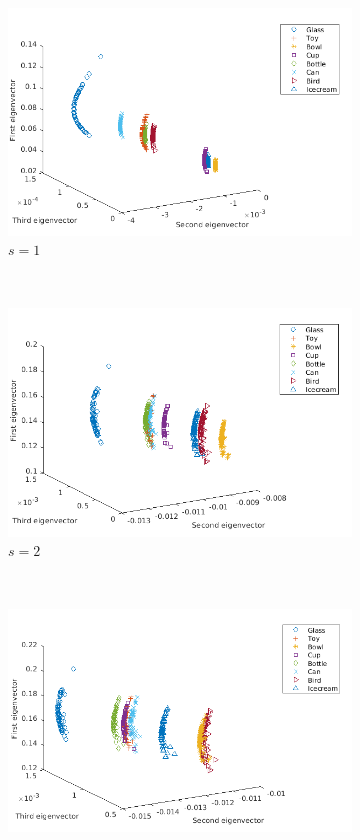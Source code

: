 \documentclass[10pt,a4paper]{article}
\theoremstyle{plain}
\theoremstyle{definition}
\begin{document}
\begin{figure}[H]
	\centering
	\begin{subfigure}[b]{0.5\textwidth}
		\includegraphics[width= \textwidth]{images/Zeta-Mellin1.png}
		\caption{$s=1$}
		\label{}
	\end{subfigure}~
	\begin{subfigure}[b]{0.5\textwidth}
		\includegraphics[width= \textwidth]{images/Zeta-Mellin3.png}
		\caption{$s=2$}
		\label{}
	\end{subfigure}\\
	\begin{subfigure}[b]{0.5\textwidth}
		\includegraphics[width= \textwidth]{images/Zeta-Mellin4.png}

\end{subfigure}
\end{figure}
\end{document}
